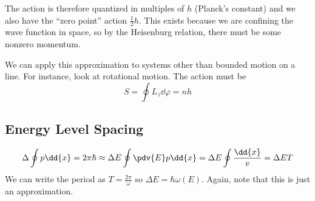\documentclass[a4paper,twoside,master.tex]{subfiles}
\begin{document}
The action is therefore quantized in multiples of $ h $ (Planck's constant) and we also have the ``zero point'' action $ \frac{1}{2} h $. This exists because we are confining the wave function in space, so by the Heisenburg relation, there must be some nonzero momentum.

We can apply this approximation to systems other than bounded motion on a line. For instance, look at rotational motion. The action must be
\begin{equation}
    S = \oint L_z \dd{\varphi} = nh
\end{equation}

\subsection{Energy Level Spacing}
\label{sub:energy_level_spacing}

\begin{equation}
    \Delta \oint p \dd{x} = 2 \pi \hbar \approx \Delta E \oint \pdv{E} p \dd{x} = \Delta E \oint \frac{\dd{x}}{v} = \Delta E T
\end{equation}
We can write the period as $ T = \frac{2 \pi}{\omega} $ so $ \Delta E = \hbar \omega(E) $. Again, note that this is just an approximation.
\end{document}
